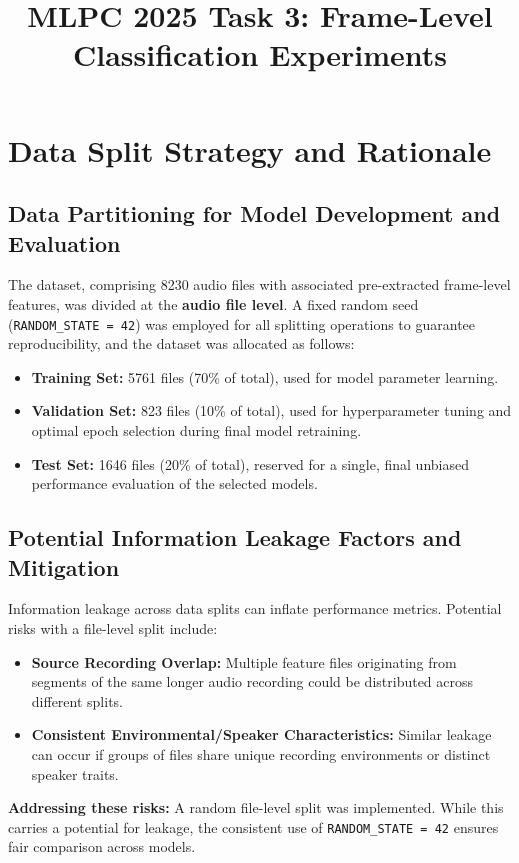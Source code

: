 \documentclass[11pt, a4paper]{article}
\title{MLPC 2025 Task 3: Frame-Level Classification Experiments}
\newcommand{\code}[1]{\texttt{#1}}
\begin{document}
\maketitle
\pagestyle{plain}

\section{Data Split Strategy and Rationale}
\label{sec:data_split}

\subsection{Data Partitioning for Model Development and Evaluation}
The dataset, comprising 8230 audio files with associated pre-extracted frame-level features, was divided at the \textbf{audio file level}. A fixed random seed (\code{RANDOM\_STATE = 42}) was employed for all splitting operations to guarantee reproducibility, and the dataset was allocated as follows:
\begin{itemize}
    \item \textbf{Training Set:} 5761 files (70\% of total), used for model parameter learning.
    \item \textbf{Validation Set:} 823 files (10\% of total), used for hyperparameter tuning and optimal epoch selection during final model retraining.
    \item \textbf{Test Set:} 1646 files (20\% of total), reserved for a single, final unbiased performance evaluation of the selected models.
\end{itemize}

\subsection{Potential Information Leakage Factors and Mitigation}
Information leakage across data splits can inflate performance metrics. Potential risks with a file-level split include:
\begin{itemize}
    \item \textbf{Source Recording Overlap:} Multiple feature files originating from segments of the same longer audio recording could be distributed across different splits.
    \item \textbf{Consistent Environmental/Speaker Characteristics:} Similar leakage can occur if groups of files share unique recording environments or distinct speaker traits.
\end{itemize}
\textbf{Addressing these risks:} A random file-level split was implemented. While this carries a potential for leakage, the consistent use of \code{RANDOM\_STATE = 42} ensures fair comparison across models.
\end{document}
